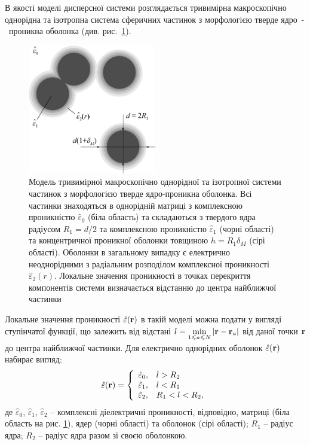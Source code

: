 \documentclass[14pt,twoside]{vakthesis}
\begin{document}
В якості моделі дисперсної системи розглядається тривимірна макроскопічно однорідна та ізотропна система сферичних частинок з морфологією тверде ядро~-~проникна оболонка (див. рис.~\ref{fig:model-Mlayers}). 
\begin{figure}[!b]
	\vspace{20pt}
	\centering
	\includegraphics[width=0.5\textwidth]{Fig1_Microstructure_new5.eps}
	\caption{\label{fig:model-Mlayers}
		Модель тривимірної макроскопічно однорідної та ізотропної системи частинок з морфологією тверде ядро-проникна оболонка. Всі частинки знаходяться в однорідній матриці з комплексною проникністю $\hat{\varepsilon}_0$ (біла область) та складаються з твердого ядра радіусом $R_1=d/2$ та комплексною проникністю $\hat{\varepsilon}_1$ (чорні області) та концентричної проникної оболонки товщиною $h=R_1\delta_M$ (сірі області). Оболонки в загальному випадку є електрично неоднорідними з радіальним розподілом комплексної проникності $\hat{\varepsilon}_2(r)$. Локальне значення проникності в точках перекриття компонентів системи визначається відстанню до центра найближчої частинки}
\end{figure} 
Локальне значення проникності $\hat{\varepsilon} ({\bf r})$ в такій моделі можна подати у вигляді ступінчатої функції, що залежить від відстані $l = \min\limits_{1 \leq a \leq N} |{\bf r} - {\bf r}_a|$ від даної точки ${\bf r}$ до центра найближчої частинки. Для електрично однорідних оболонок $\hat{\varepsilon} ({\bf r})$ набирає вигляд:
\begin{equation}\label{eq:local-perm-1layer}
\hat{\varepsilon} ({\bf r}) = \left\{ 
\begin{array}{ll}
\hat{\varepsilon}_0, & l > R_2\\
\hat{\varepsilon}_1, & l < R_1\\
\hat{\varepsilon}_2, & R_1 < l < R_2,
\end{array}
\right.
\end{equation}
де $\hat{\varepsilon}_0$, $\hat{\varepsilon}_1$, $\hat{\varepsilon}_2$ -- комплексні діелектричні проникності, відповідно, матриці (біла область на рис. \ref{fig:model-Mlayers}), ядер (чорні області) та оболонок (сірі області); $R_1$ -- радіус ядра; $R_2$ -- радіус ядра разом зі своєю оболонкою. 
\end{document}
